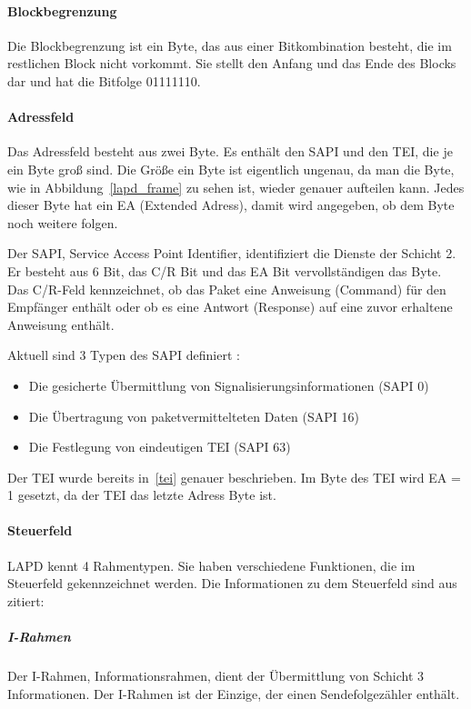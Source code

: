 \documentclass[12pt, a4paper, ngerman]{article}
\begin{document}
\paragraph{Blockbegrenzung \label{blockbegrenzung}}
Die Blockbegrenzung ist ein Byte, das aus einer Bitkombination besteht, die im restlichen Block nicht vorkommt. Sie stellt den Anfang und das Ende des Blocks dar und hat die Bitfolge 01111110.

\paragraph{Adressfeld}
Das Adressfeld besteht aus zwei Byte. Es enthält den SAPI und den TEI, die je ein Byte groß sind. Die Größe ein Byte ist eigentlich ungenau, da man die Byte, wie in Abbildung~\ref{lapd_frame} zu sehen ist, wieder genauer aufteilen kann. Jedes dieser Byte hat ein EA (Extended Adress), damit wird angegeben, ob dem Byte noch weitere folgen. 

Der SAPI, Service Access Point Identifier,  identifiziert die Dienste der Schicht 2. Er besteht aus 6 Bit,  das C/R Bit und das EA Bit vervollständigen das Byte. Das C/R-Feld kennzeichnet, ob das Paket eine Anweisung (Command) für den Empfänger enthält oder ob es eine Antwort (Response) auf eine zuvor erhaltene Anweisung enthält. 

Aktuell sind 3 Typen des SAPI definiert \cite{SWB-098672061}:
\begin{itemize}
	\item Die gesicherte Übermittlung von Signalisierungsinformationen (SAPI 0)
	\item Die Übertragung von paketvermittelteten Daten (SAPI 16)
	\item Die Festlegung von eindeutigen TEI (SAPI 63)
\end{itemize}



Der TEI wurde bereits in~\ref{tei} genauer beschrieben. Im Byte des TEI wird EA = 1 gesetzt, da der TEI das letzte Adress Byte ist.

\paragraph{Steuerfeld}
LAPD kennt 4 Rahmentypen. Sie haben verschiedene Funktionen, die im Steuerfeld gekennzeichnet werden. Die Informationen zu dem Steuerfeld sind aus \cite{SWB-098672061} zitiert:

\subparagraph{I-Rahmen}
Der I-Rahmen, Informationsrahmen, dient der Übermittlung von Schicht 3 Informationen. Der I-Rahmen ist der Einzige, der einen Sendefolgezähler enthält.
\end{document}
